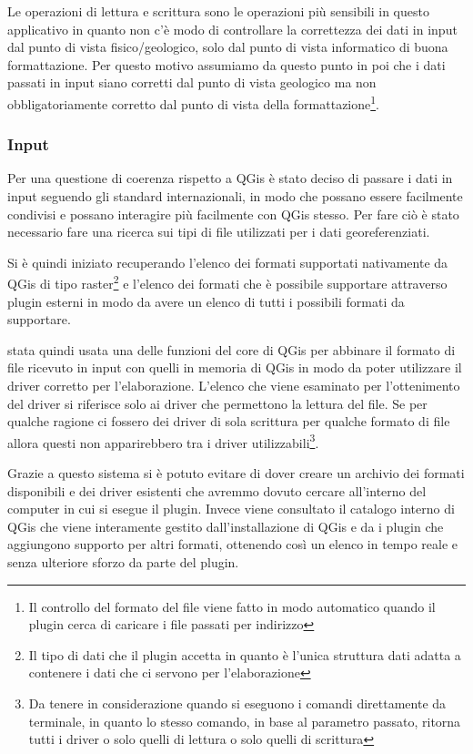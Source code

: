 Le operazioni di lettura e scrittura sono le operazioni più sensibili in questo applicativo in quanto non c'è modo di controllare la correttezza dei dati in input dal punto di vista fisico/geologico, solo dal punto di vista informatico di buona formattazione.
Per questo motivo assumiamo da questo punto in poi che i dati passati in input siano corretti dal punto di vista geologico ma non obbligatoriamente corretto dal punto di vista della formattazione\footnote{Il controllo del formato del file viene fatto in modo automatico quando il plugin cerca di caricare i file passati per indirizzo}.

\subsubsection{Input}
Per una questione di coerenza rispetto a QGis è stato deciso di passare i dati in input seguendo gli standard internazionali, in modo che possano essere facilmente condivisi e possano interagire più facilmente con QGis stesso. Per fare ciò è stato necessario fare una ricerca sui tipi di file utilizzati per i dati georeferenziati.

Si è quindi iniziato recuperando l'elenco dei formati supportati nativamente da QGis di tipo raster\footnote{Il tipo di dati che il plugin accetta in quanto è l'unica struttura dati adatta a contenere i dati che ci servono per l'elaborazione} e l'elenco dei formati che è possibile supportare attraverso plugin esterni in modo da avere un elenco di tutti i possibili formati da supportare.

\egrave stata quindi usata una delle funzioni del core di QGis per abbinare il formato di file ricevuto in input con quelli in memoria di QGis in modo da poter utilizzare il driver corretto per l'elaborazione. L'elenco che viene esaminato per l'ottenimento del driver si riferisce solo ai driver che permettono la lettura del file. Se per qualche ragione ci fossero dei driver di sola scrittura per qualche formato di file allora questi non apparirebbero tra i driver utilizzabili\footnote{Da tenere in considerazione quando si eseguono i comandi direttamente da terminale, in quanto lo stesso comando, in base al parametro passato, ritorna tutti i driver o solo quelli di lettura o solo quelli di scrittura}.

Grazie a questo sistema si è potuto evitare di dover creare un archivio dei formati disponibili e dei driver esistenti che avremmo dovuto cercare all'interno del computer in cui si esegue il plugin. Invece viene consultato il catalogo interno di QGis che viene interamente gestito dall'installazione di QGis e da i plugin che aggiungono supporto per altri formati, ottenendo così un elenco in tempo reale e senza ulteriore sforzo da parte del plugin.

